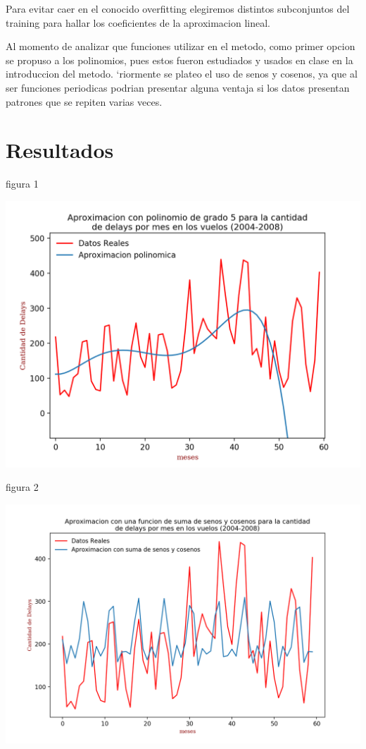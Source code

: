 \documentclass{endm}
\begin{document}
	Para evitar caer en el conocido overfitting elegiremos distintos subconjuntos del training para hallar los coeficientes de la aproximacion lineal.


	Al momento de analizar que funciones utilizar en el metodo, como primer opcion se propuso a los polinomios, pues estos fueron estudiados y usados en clase en la introduccion del metodo. `riormente se plateo el uso de senos y cosenos, ya que al ser funciones periodicas podrian presentar alguna ventaja si los datos presentan patrones que se repiten varias veces.



\section{Resultados}

	\begin{center}
	\caption{figura 1}
	\includegraphics[scale=0.7]{imagenes/delaysPolinomio.png}
	\end{center}

	\begin{center}
	\caption{figura 2}
	\includegraphics[scale=0.6]{imagenes/senosCosenos.png}
	\end{center}
\end{document}
